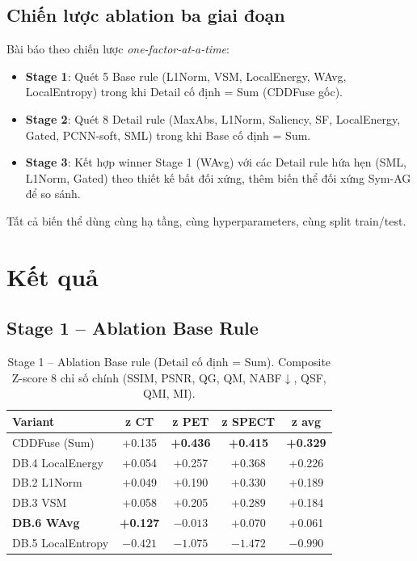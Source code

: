 \documentclass[12pt,a4paper]{article}
\begin{document}
\subsection{Chiến lược ablation ba giai đoạn}

Bài báo theo chiến lược \emph{one-factor-at-a-time}:
\begin{itemize}\itemsep1pt
  \item \textbf{Stage 1}: Quét 5 Base rule (L1Norm, VSM, LocalEnergy, WAvg,
        LocalEntropy) trong khi Detail cố định = Sum (CDDFuse gốc).
  \item \textbf{Stage 2}: Quét 8 Detail rule (MaxAbs, L1Norm, Saliency, SF,
        LocalEnergy, Gated, PCNN-soft, SML) trong khi Base cố định = Sum.
  \item \textbf{Stage 3}: Kết hợp winner Stage 1 (WAvg) với các Detail rule
        hứa hẹn (SML, L1Norm, Gated) theo thiết kế bất đối xứng, thêm biến thể
        đối xứng Sym-AG để so sánh.
\end{itemize}
Tất cả biến thể dùng cùng hạ tầng, cùng hyperparameters, cùng split train/test.

\section{Kết quả}
\label{sec:results}

\subsection{Stage 1 -- Ablation Base Rule}

\begin{table}[h]
\centering
\caption{Stage 1 -- Ablation Base rule (Detail cố định = Sum). Composite
Z-score 8 chỉ số chính (SSIM, PSNR, QG, QM, NABF$\downarrow$, QSF, QMI, MI).}
\label{tab:stage1}
\small
\setlength{\tabcolsep}{4pt}
\begin{tabular}{lcccc}
\toprule
\textbf{Variant} & \textbf{z CT} & \textbf{z PET} & \textbf{z SPECT} & \textbf{z avg} \\
\midrule
CDDFuse (Sum)       & +0.135 & \textbf{+0.436} & \textbf{+0.415} & \textbf{+0.329} \\
DB.4 LocalEnergy    & +0.054 & +0.257 & +0.368 & +0.226 \\
DB.2 L1Norm         & +0.049 & +0.190 & +0.330 & +0.189 \\
DB.3 VSM            & +0.058 & +0.205 & +0.289 & +0.184 \\
\textbf{DB.6 WAvg}  & \textbf{+0.127} & $-0.013$ & +0.070 & +0.061 \\
DB.5 LocalEntropy   & $-0.421$ & $-1.075$ & $-1.472$ & $-0.990$ \\
\bottomrule
\end{tabular}
\end{table}
\end{document}
